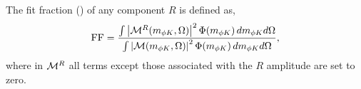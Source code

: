 The fit fraction (\FiFr) of any component $R$ is defined as,
\begin{equation}
{\rm FF} = \frac{
\int \left|\mathcal{M}^R(m_{\phi K},\Omega)\right|^2 \Phi(m_{\phi K})\,dm_{\phi K}d\Omega
}{
\int \left|\mathcal{M}(m_{\phi K},\Omega)\right|^2 \Phi(m_{\phi K})\,dm_{\phi K}d\Omega
},
\label{eq:ff}
\end{equation}
where in $\mathcal{M}^R$ 
all terms except those associated with the $R$ amplitude are set to zero. 










